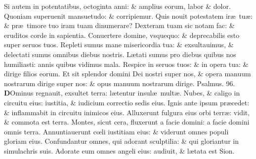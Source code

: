 \documentclass[a5paper,10pt]{book}
\def\ae{æ}
\def\oe{œ}
\begin{document}
\begin{multicols*}{2}
\newline \color{red} S\color{black}i autem in potentatibus, octoginta anni: \& amplius eorum, labor \& dolor.
\newline \color{red} Q\color{black}uoniam superuenit mansuetudo: \& corripiemur.
\newline \color{red} Q\color{black}uis nouit potestatem ir\ae \ tu\ae : \& pr\ae \ timore tuo iram tuam dinumerare?
\newline \color{red} D\color{black}exteram tuam sic notam fac: \& eruditos corde in sapientia.
\newline \color{red} C\color{black}onuertere domine, vsquequo: \& deprecabilis esto super seruos tuos.
\newline \color{red} R\color{black}epleti sumus mane misericordia tua: \& exsultauimus, \& delectati sumus omnibus diebus nostris.
\newline \color{red} L\color{black}\ae tati sumus pro diebus quibus nos humiliasti: annis quibus vidimus mala.
\newline \color{red} R\color{black}espice in seruos tuos: \& in opera tua: \& dirige filios eorum.
\newline \color{red} E\color{black}t sit splendor domini Dei nostri super nos, \& opera manuum nostrarum dirige super nos: \& opus manuum nostrarum dirige. \quad \color{red} Psalmus. 96. \color{black}
\vspace{-1em}
\lettrine[lines=2]{\bfseries \color{red} D}{}Ominus regnauit, exsultet terra: l\ae tentur insul\ae \ mult\ae .
\newline \color{red} N\color{black}ubes, \& caligo in circuitu eius: iustitia, \& iudicium correctio sedis eius.
\newline \color{red} I\color{black}gnis ante ipsum pr\ae cedet: \& inflammabit in circuitu inimicos eius.
\newline \color{red} A\color{black}lluxerunt fulgura eius orbi terr\ae : vidit, \& commota est terra.%
\newline \color{red} M\color{black}ontes, sicut cera, fluxerunt a facie domini: a facie domini omnis terra.
\newline \color{red} A\color{black}nnuntiauerunt c\oe li iustitiam eius: \& viderunt omnes populi gloriam eius.
\newline \color{red} C\color{black}onfundantur omnes, qui adorant sculptilia: \& qui gloriantur in simulachris suis.
\newline \color{red} A\color{black}dorate eum omnes angeli eius: audiuit, \& l\ae tata est Sion.

\end{multicols*}
\end{document}
